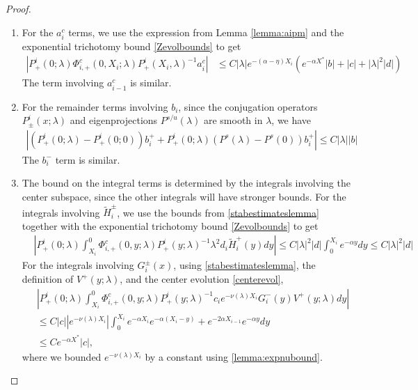\documentclass[thesis.tex]{subfiles}
\begin{document}
\begin{lemma}
\begin{proof}
\begin{enumerate}
\item For the $a_i^c$ terms, we use the expression from Lemma \ref{lemma:aipm} and the exponential trichotomy bound \cref{Zevolbounds} to get
\begin{align*}
|P^i_+(0; \lambda) \Phi^c_{i,+}(0, X_i; \lambda) P^i_+(X_i, \lambda)^{-1} a_i^c| &\leq C |\lambda| e^{-(\alpha - \eta) X_i} \left( e^{-\alpha X^*}  |b| + |c| +|\lambda|^2 |d| \right)
\end{align*}
The term involving $a_{i-1}^c$ is similar. 

\item For the remainder terms involving $b_i$, since the conjugation operators $P^i_\pm(x; \lambda)$ and eigenprojections $P^{s/u}(\lambda)$ are smooth in $\lambda$, we have
\begin{align*}
|(P^i_+(0; \lambda) - P^i_+(0; 0))b_i^+ + P^i_+(0; \lambda) (P^s(\lambda) - P^s(0)) b_i^+| \leq C |\lambda| |b|
\end{align*}
The $b_i^-$ term is similar.

\item The bound on the integral terms is determined by the integrals involving the center subspace, since the other integrals will have stronger bounds. For the integrals involving $\tilde{H}_i^\pm$, we use the bounds from \cref{stabestimateslemma} together with the exponential trichotomy bound \cref{Zevolbounds} to get
\begin{align*}
&\left| P^i_+(0; \lambda) \int_{X_i}^0 \Phi^c_{i,+}(0, y; \lambda) P^i_+(y; \lambda)^{-1} \lambda^2 d_i \tilde{H}_i^+(y) dy \right| \leq C |\lambda|^2 |d| \int_0^{X_i} e^{-\alpha y} dy \leq C |\lambda|^2 |d|
\end{align*}
For the integrals involving $G_i^\pm(x)$, using \cref{stabestimateslemma}, the definition of $V^+(y; \lambda)$, and the center evolution \cref{centerevol},
\begin{align*}
&\left| P^i_+(0; \lambda) \int_{X_i}^0 \Phi^c_{i,+}(0, y; \lambda) P^i_+(y; \lambda)^{-1} c_i e^{-\nu(\lambda)X_i} G_i^-(y)V^+(y; \lambda) dy \right| \\
&\leq C |c| \left| e^{-\nu(\lambda)X_i} \right| \int_0^{X_i} e^{-\alpha X_i} e^{-\alpha(X_i - y) } + e^{-2 \alpha X_{i-1}} e^{-\alpha y} dy \\
&\leq C e^{-\alpha X^*} |c|,
\end{align*}
where we bounded $e^{-\nu(\lambda)X_i}$ by a constant using \cref{lemma:expnubound}.
\end{enumerate}


\end{proof}
\end{lemma}
\end{document}
